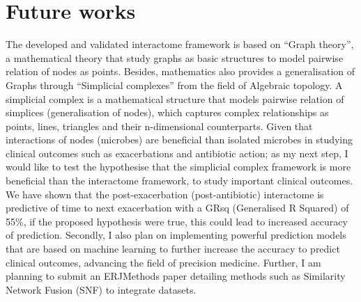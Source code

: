 \chapter*{Future works}

The developed and validated interactome framework is based on “Graph theory”, a mathematical theory that study graphs as basic structures to model pairwise relation of nodes as points. Besides, mathematics also provides a generalisation of Graphs through “Simplicial complexes” from the field of Algebraic topology. A simplicial complex is a mathematical structure that models pairwise relation of simplices (generalisation of nodes), which captures complex relationships as points, lines, triangles and their n-dimensional counterparts. Given that interactions of nodes (microbes) are beneficial than isolated microbes in studying clinical outcomes such as exacerbations and antibiotic action; as my next step, I would like to test the hypothesise that the simplicial complex framework is more beneficial than the interactome framework, to study important clinical outcomes. We have shown that the post-exacerbation (post-antibiotic) interactome is predictive of time to next exacerbation with a GRsq (Generalised R Squared) of 55\%, if the proposed hypothesis were true, this could lead to increased accuracy of prediction. Secondly, I also plan on implementing powerful prediction models that are based on machine learning to further increase the accuracy to predict clinical outcomes, advancing the field of precision medicine. Further, I am planning to submit an ERJMethods paper detailing methods such as Similarity Network Fusion (SNF) to integrate datasets.